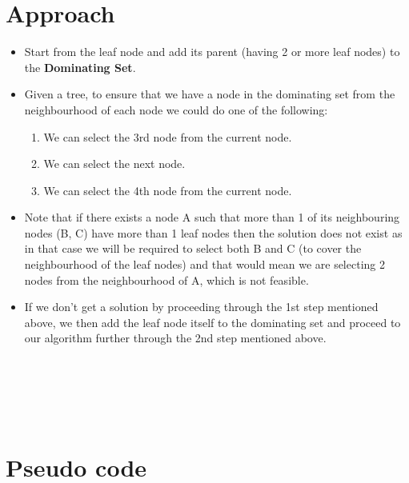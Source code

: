 \documentclass[letterpaper, 11pt]{article}
\begin{document}
\section{Approach}
\label{sec:approach}
\begin{itemize}
    \item Start from the leaf node and add its parent (having 2 or more leaf nodes) to the \textbf{Dominating Set}.
    \item Given a tree, to ensure that we have a node in the dominating set from the neighbourhood of each node we could do one of the following:
        \begin{enumerate}
            \item We can select the 3rd node from the current node.
            \item We can select the next node.
            \item We can select the 4th node from the current node.
        \end{enumerate}
    \item Note that if there exists a node A such that more than 1 of its neighbouring nodes (B, C) have more than 1 leaf nodes then the solution does not exist as in that case we will be required to select both B and C (to cover the neighbourhood of the leaf nodes) and that would mean we are selecting 2 nodes from the neighbourhood of A, which is not feasible.
    
    \item If we don’t get a solution by proceeding through the 1st step mentioned above, we then add the leaf node itself to the dominating set and proceed to our algorithm further through the 2nd step mentioned above.
\end{itemize}
\\\\\\\
    
\section{Pseudo code }
\label{sec:pseudocode}
\end{document}
